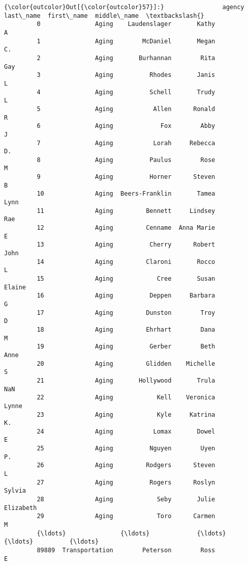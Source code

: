 \documentclass[11pt]{article}
\begin{document}
\begin{Verbatim}[commandchars=\\\{\}]
{\color{outcolor}Out[{\color{outcolor}57}]:}                agency       last\_name  first\_name  middle\_name  \textbackslash{}
         0               Aging    Laudenslager       Kathy            A   
         1               Aging        McDaniel       Megan           C.   
         2               Aging       Burhannan        Rita          Gay   
         3               Aging          Rhodes       Janis            L   
         4               Aging          Schell       Trudy            L   
         5               Aging           Allen      Ronald            R   
         6               Aging             Fox        Abby            J   
         7               Aging           Lorah     Rebecca           D.   
         8               Aging          Paulus        Rose            M   
         9               Aging          Horner      Steven            B   
         10              Aging  Beers-Franklin       Tamea         Lynn   
         11              Aging         Bennett     Lindsey          Rae   
         12              Aging         Cenname  Anna Marie            E   
         13              Aging          Cherry      Robert         John   
         14              Aging         Claroni       Rocco            L   
         15              Aging            Cree       Susan       Elaine   
         16              Aging          Deppen     Barbara            G   
         17              Aging         Dunston        Troy            D   
         18              Aging         Ehrhart        Dana            M   
         19              Aging          Gerber        Beth         Anne   
         20              Aging         Glidden    Michelle            S   
         21              Aging       Hollywood       Trula          NaN   
         22              Aging            Kell    Veronica        Lynne   
         23              Aging            Kyle     Katrina           K.   
         24              Aging           Lomax       Dowel            E   
         25              Aging          Nguyen        Uyen           P.   
         26              Aging         Rodgers      Steven            L   
         27              Aging          Rogers      Roslyn       Sylvia   
         28              Aging            Seby       Julie    Elizabeth   
         29              Aging            Toro      Carmen            M   
         {\ldots}               {\ldots}             {\ldots}         {\ldots}          {\ldots}   
         89889  Transportation        Peterson        Ross            E   

\end{Verbatim}
\end{document}
